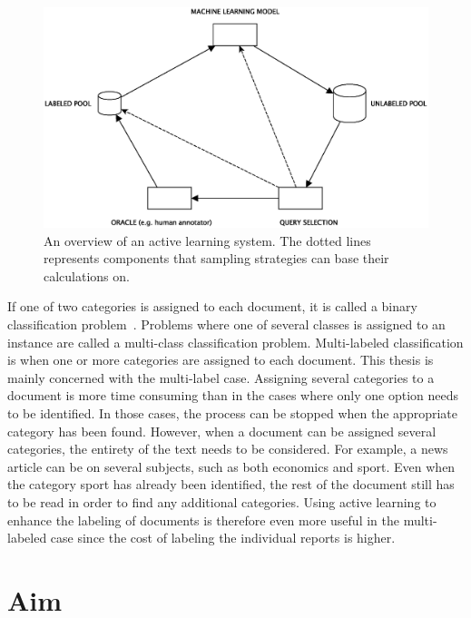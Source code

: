 \begin{figure}
    \centering
    \includegraphics[width=\textwidth]{figures/active-learning-model.eps}
    \caption{An overview of an active learning system. 
    The dotted lines represents components that sampling strategies can base their calculations on.}
    \label{fig:active-learning-model}
\end{figure}

If one of two categories is assigned to each document, it is called a binary classification problem~\cite{bishop2006pattern}.
Problems where one of several classes is assigned to an instance are called a multi-class classification problem.
Multi-labeled classification is when one or more categories are assigned to each document.
This thesis is mainly concerned with the multi-label case.
Assigning several categories to a document is more time consuming than in the cases where only one option needs to be identified.
In those cases, the process can be stopped when the appropriate category has been found.
However, when a document can be assigned several categories, the entirety of the text needs to be considered.
For example, a news article can be on several subjects, such as both economics and sport.
Even when the category sport has already been identified, the rest of the document still has to be read in order to find any additional categories.
Using active learning to enhance the labeling of documents is therefore even more useful in the multi-labeled case since the cost of labeling the individual reports is higher.

\section{Aim}
\label{sec:aim}

